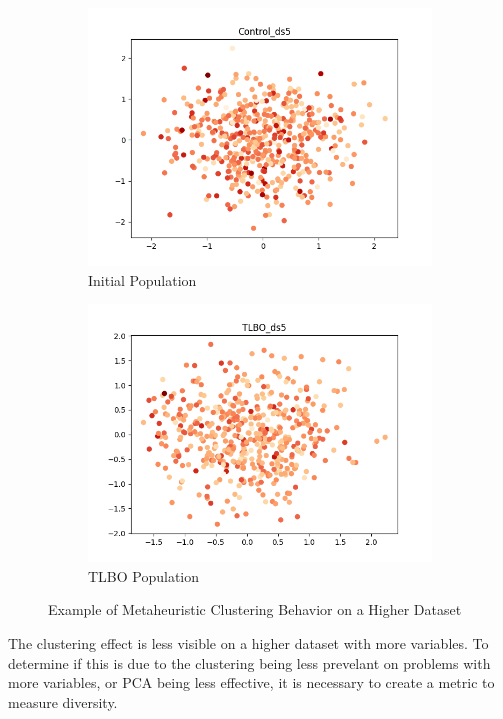 \documentclass[11pt, letterpaper, onecolumn]{article}
\begin{document}
\begin{figure}[h!]
  \centering
  \begin{subfigure}[!h]{0.4\linewidth}
    \includegraphics[width=\linewidth]{graphs/Control_ds5__pca.png}
    \caption{Initial Population}
  \end{subfigure}
  \begin{subfigure}[!h]{0.4\linewidth}
    \includegraphics[width=\linewidth]{graphs/TLBO_ds5__pca.png}
    \caption{TLBO Population}
  \end{subfigure}
  \caption{Example of Metaheuristic Clustering Behavior on a Higher Dataset}
  \label{fig:coffee}
\end{figure}

The clustering effect is less visible on a higher dataset with more variables. To determine if this is due to the clustering being less prevelant on problems with more variables, or PCA being less effective, it is necessary to create a metric to measure diversity. 
\end{document}
